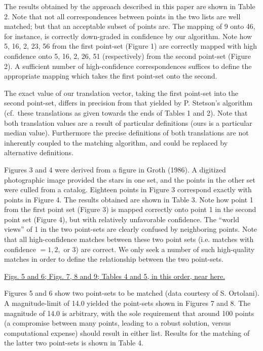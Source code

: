 \bigskip


The results obtained by the approach described in this paper are shown
in Table 2. Note that not all correspondences between points in the two
lists are well matched; but that an acceptable subset of points are.  The 
mapping of 9 onto 46, for instance, is correctly down-graded in confidence 
by our algorithm.  Note how 5, 16, 2, 23, 56 from the first point-set (Figure
1) are correctly mapped with high confidence onto 5, 16, 2, 26, 51 
(respectively) from the second point-set (Figure 2).  A sufficient number of
high-confidence correspondences suffices to define the appropriate mapping
which takes the first point-set onto the second.  

The exact value of our
translation vector, taking the first point-set into the second point-set,
differs in precision from that yielded by P. Stetson's algorithm (cf.\ these
translations as given towards the ends of Tables 1 and 2).  Note that both 
translation values are a result of particular definitions (ours is a particular
median value).  Furthermore the precise definitions of both translations are 
not
inherently coupled to the matching algorithm, and could be replaced by 
alternative definitions.

Figures 3 and 4 were derived from a figure in Groth (1986).  A digitized 
photographic image provided the stars in one set, and the points in the
other set were culled from a catalog.  Eighteen points in Figure 3 correspond
exactly with points in Figure 4. The results obtained are shown in
Table 3.  Note how point 1 from the first point set (Figure 3) is mapped 
correctly
onto point 1 in the second point set (Figure 4), but with relatively 
unfavorable confidence.  The ``world views'' of 1 in the two 
point-sets are clearly confused by neighboring points.
Note that all high-confidence matches between these
two point sets (i.e. matches with confidence $= 1, 2, $ or $3$) are 
correct.  We only 
seek a number of such high-quality matches in order to define the relationship
between the two point-sets.


\begin{center}
\bigskip

\underline{Figs. 5 and 6; Figs. 7, 8 and 9; Tables 4 and 5,
in this order,
near here.}

\end{center}

\bigskip
Figures 
5 and 6 show two point-sets to be matched (data courtesy of S. Ortolani).
A magnitude-limit of 14.0 yielded the point-sets shown in Figures 7 and 8.
The magnitude of 14.0 is arbitrary, with the sole requirement that around
100 points (a compromise between many points, leading to a robust solution,
versus computational expense) should result in either list.
Results for the matching of the latter two point-sets is shown in Table 4.

